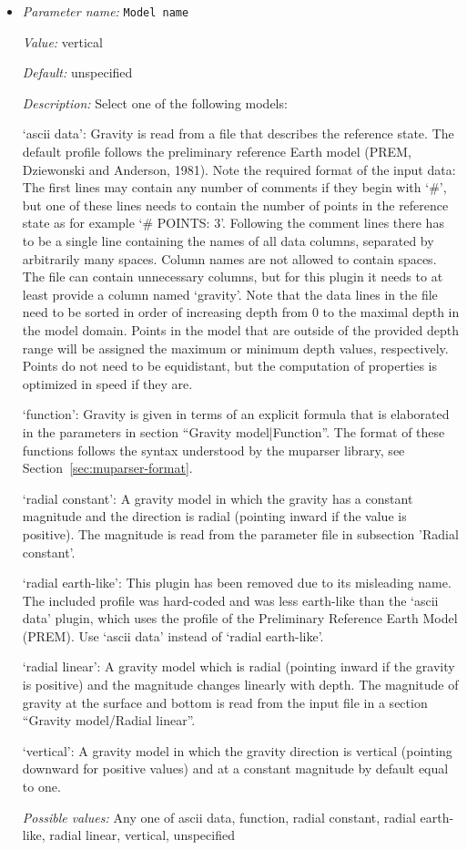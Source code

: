 \begin{itemize}
\item {\it Parameter name:} {\tt Model name}
\label{parameters:Gravity model/Model name}
\label{parameters:Gravity_20model/Model_20name}


{\it Value:} vertical


{\it Default:} unspecified


{\it Description:} Select one of the following models:

`ascii data': Gravity is read from a file that describes the reference state. The default profile follows the preliminary reference Earth model (PREM, Dziewonski and Anderson, 1981). Note the required format of the input data: The first lines may contain any number of comments if they begin with `#', but one of these lines needs to contain the number of points in the reference state as for example `# POINTS: 3'. Following the comment lines there has to be a single line containing the names of all data columns, separated by arbitrarily many spaces. Column names are not allowed to contain spaces. The file can contain unnecessary columns, but for this plugin it needs to at least provide a column named `gravity'. Note that the data lines in the file need to be sorted in order of increasing depth from 0 to the maximal depth in the model domain. Points in the model that are outside of the provided depth range will be assigned the maximum or minimum depth values, respectively. Points do not need to be equidistant, but the computation of properties is optimized in speed if they are.

`function': Gravity is given in terms of an explicit formula that is elaborated in the parameters in section ``Gravity model|Function''. The format of these functions follows the syntax understood by the muparser library, see Section~\ref{sec:muparser-format}.

`radial constant': A gravity model in which the gravity has a constant magnitude and the direction is radial (pointing inward if the value is positive). The magnitude is read from the parameter file in subsection 'Radial constant'.

`radial earth-like': This plugin has been removed due to its misleading name. The included profile was hard-coded and was less earth-like than the `ascii data' plugin, which uses the profile of the Preliminary Reference Earth Model (PREM). Use `ascii data' instead of `radial earth-like'.

`radial linear': A gravity model which is radial (pointing inward if the gravity is positive) and the magnitude changes linearly with depth. The magnitude of gravity at the surface and bottom is read from the input file in a section ``Gravity model/Radial linear''.

`vertical': A gravity model in which the gravity direction is vertical (pointing downward for positive values) and at a constant magnitude by default equal to one.


{\it Possible values:} Any one of ascii data, function, radial constant, radial earth-like, radial linear, vertical, unspecified
\end{itemize}
